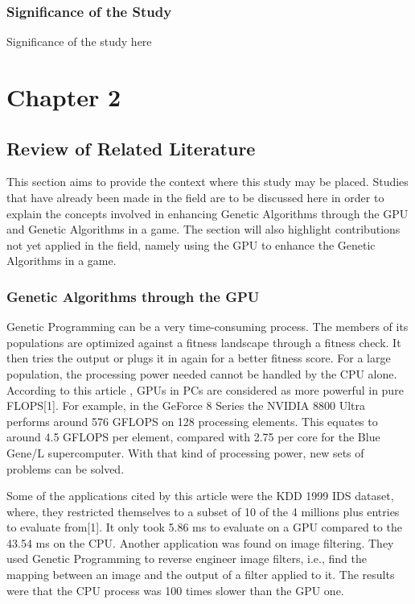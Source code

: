 \documentclass[letterpaper,10pt,titlepage]{article}
\begin{document}
\subsubsection*{Significance of the Study}
Significance of the study here



\section*{Chapter 2}
\subsection*{Review of Related Literature}

	This section aims to provide the context where this study may be placed. 
	Studies that have already been made in the field are to be discussed here in order to 
	explain the concepts involved in enhancing Genetic Algorithms through the GPU and 
	Genetic Algorithms in a game. The section will also highlight contributions not yet 
	applied in the field, namely using the GPU to enhance the Genetic Algorithms in a game.

\subsubsection*{Genetic Algorithms through the GPU}
	

	Genetic Programming can be a very time-consuming process.  The members of its populations are optimized against a fitness landscape through a fitness check.  
	It then tries the output or plugs it in again for a better fitness score. For a large population, the processing power needed cannot be handled by the CPU alone.  
	According to this article , GPUs in PCs are considered as more powerful in pure FLOPS[1].  For example, in the GeForce 8 Series the NVIDIA 8800 Ultra performs around 576 GFLOPS 
	on 128 processing elements.  This equates to around 4.5 GFLOPS per element, compared with 2.75 per core for the Blue Gene/L supercomputer.  With that kind of processing power, 
	new sets of problems can be solved.  

	Some of the applications cited by this article were the KDD 1999 IDS dataset, where, they restricted themselves to a subset of 10%
	of the 4 millions plus entries to evaluate from[1].  It only took 5.86 ms to evaluate on a GPU compared to the 43.54 ms on the CPU.  Another application was found on image filtering.  
	They used Genetic Programming to reverse engineer image filters, i.e., find the mapping between an image and the output of a filter applied to it.  The results were that the CPU process 
	was 100 times slower than the GPU one.  
\end{document}

